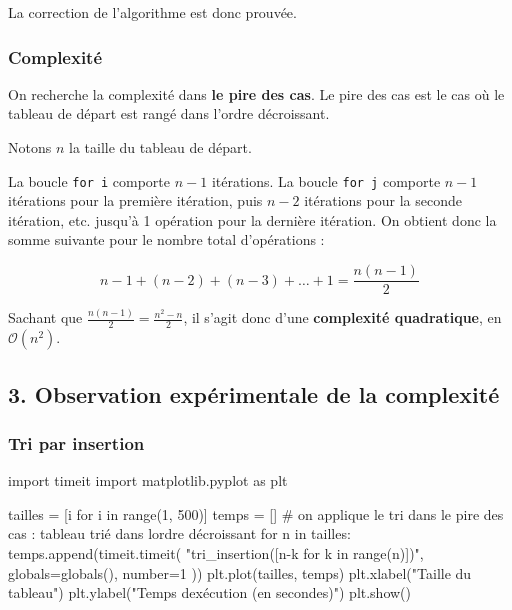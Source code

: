 \documentclass[
  a4paper,
  DIV=11,
  numbers=noendperiod]{scrartcl}
\newenvironment{Shaded}{\begin{snugshade}}{\end{snugshade}}
\newcommand{\BuiltInTok}[1]{\textcolor[rgb]{0.00,0.23,0.31}{#1}}
\newcommand{\CommentTok}[1]{\textcolor[rgb]{0.37,0.37,0.37}{#1}}
\newcommand{\ControlFlowTok}[1]{\textcolor[rgb]{0.00,0.23,0.31}{#1}}
\newcommand{\DecValTok}[1]{\textcolor[rgb]{0.68,0.00,0.00}{#1}}
\newcommand{\ImportTok}[1]{\textcolor[rgb]{0.00,0.46,0.62}{#1}}
\newcommand{\KeywordTok}[1]{\textcolor[rgb]{0.00,0.23,0.31}{#1}}
\newcommand{\NormalTok}[1]{\textcolor[rgb]{0.00,0.23,0.31}{#1}}
\newcommand{\OperatorTok}[1]{\textcolor[rgb]{0.37,0.37,0.37}{#1}}
\newcommand{\StringTok}[1]{\textcolor[rgb]{0.13,0.47,0.30}{#1}}
\begin{document}
La correction de l'algorithme est donc prouvée.

\hypertarget{complexituxe9-1}{%
\subsubsection{Complexité}\label{complexituxe9-1}}

On recherche la complexité dans \textbf{le pire des cas}. Le pire des
cas est le cas où le tableau de départ est rangé dans l'ordre
décroissant.

Notons \(n\) la taille du tableau de départ.

La boucle \texttt{for\ i} comporte \(n-1\) itérations. La boucle
\texttt{for\ j} comporte \(n-1\) itérations pour la première itération,
puis \(n-2\) itérations pour la seconde itération, etc. jusqu'à 1
opération pour la dernière itération. On obtient donc la somme suivante
pour le nombre total d'opérations :

\[n-1+(n-2)+(n-3)+\ldots+1=\frac{n(n-1)}{2}\]

Sachant que \(\frac{n(n-1)}{2} = \frac{n^2-n}{2}\), il s'agit donc d'une
\textbf{complexité quadratique}, en \(\mathcal{O}(n^2)\).

\hypertarget{observation-expuxe9rimentale-de-la-complexituxe9}{%
\subsection{3. Observation expérimentale de la
complexité}\label{observation-expuxe9rimentale-de-la-complexituxe9}}

\hypertarget{tri-par-insertion-1}{%
\subsubsection{Tri par insertion}\label{tri-par-insertion-1}}

\begin{Shaded}
\begin{Highlighting}[]
\ImportTok{import}\NormalTok{ timeit}
\ImportTok{import}\NormalTok{ matplotlib.pyplot }\ImportTok{as}\NormalTok{ plt}

\NormalTok{tailles }\OperatorTok{=}\NormalTok{ [i }\ControlFlowTok{for}\NormalTok{ i }\KeywordTok{in} \BuiltInTok{range}\NormalTok{(}\DecValTok{1}\NormalTok{, }\DecValTok{500}\NormalTok{)]}
\NormalTok{temps }\OperatorTok{=}\NormalTok{ []}
\CommentTok{\# on applique le tri dans le pire des cas : tableau trié dans l\textquotesingle{}ordre décroissant}
\ControlFlowTok{for}\NormalTok{ n }\KeywordTok{in}\NormalTok{ tailles:}
\NormalTok{    temps.append(timeit.timeit(}
        \StringTok{"tri\_insertion([n{-}k for k in range(n)])"}\NormalTok{,}
        \BuiltInTok{globals}\OperatorTok{=}\BuiltInTok{globals}\NormalTok{(),}
\NormalTok{        number}\OperatorTok{=}\DecValTok{1}
\NormalTok{    ))}
\NormalTok{plt.plot(tailles, temps)}
\NormalTok{plt.xlabel(}\StringTok{"Taille du tableau"}\NormalTok{)}
\NormalTok{plt.ylabel(}\StringTok{"Temps d\textquotesingle{}exécution (en secondes)"}\NormalTok{)}
\NormalTok{plt.show()}
\end{Highlighting}
\end{Shaded}
\end{document}
